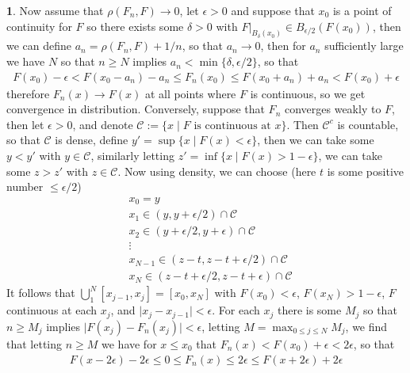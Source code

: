 \documentclass[10.5pt]{article}
\theoremstyle{definition}
\newtheorem{pb}{}
\newcommand{\set}[1]{\{#1\}}
\newcommand{\abs}[1]{\lvert#1\rvert}
\begin{document}
\begin{pb}
        Now assume that \(\rho(F_n,F) \to 0\), let \(\epsilon > 0\) and suppose that \(x_0\) is a point of continuity for \(F\) so there exists some \(\delta > 0\) with \(F\vert_{B_\delta(x_0)} \in B_{\epsilon/2}(F(x_0)) \), then we can define \(a_n = \rho(F_n,F) + 1/n\), so that \(a_n \to 0\), then for \(a_n\) sufficiently large we have \(N\) so that \(n \geq N\) implies \(a_n < \min\set{\delta,\epsilon/2}\), so that
        \begin{align*}
            F(x_0) - \epsilon < F(x_0 - a_n) - a_n \leq F_n(x_0) \leq F(x_0 + a_n) + a_n < F(x_0) + \epsilon
        \end{align*}
        therefore \(F_n(x) \to F(x)\) at all points where \(F\) is continuous, so we get convergence in distribution. Conversely, suppose that \(F_n\) converges weakly to \(F\), then let \(\epsilon > 0\), and denote \(\mathcal{C} := \set{x \mid F \text{ is continuous at }x}\). Then \(\mathcal{C}^c\) is countable, so that \(\mathcal{C}\) is dense, define \(y' = \sup\set{x \mid F(x) < \epsilon}\), then we can take some \(y < y'\) with \(y \in \mathcal{C}\), similarly letting \(z' = \inf\set{x \mid F(x) > 1 - \epsilon}\), we can take some \(z > z'\) with \(z \in \mathcal{C}\). Now using density, we can choose (here \(t\) is some positive number \(\leq \epsilon/2\))
        \begin{align*}
            &x_0 = y \\
            &x_1 \in (y,y+\epsilon/2) \cap \mathcal{C} \\
            &x_2 \in (y+\epsilon/2,y+\epsilon) \cap \mathcal{C} \\
            &\vdots \\
            &x_{N-1} \in (z - t, z - t + \epsilon/2) \cap \mathcal{C} \\
            &x_N \in (z - t + \epsilon/2, z - t + \epsilon) \cap \mathcal{C}
        \end{align*}
        It follows that \(\bigcup_1^N [x_{j-1},x_j] = [x_0,x_N]\) with \(F(x_0) < \epsilon\), \(F(x_N) > 1 - \epsilon\), \(F\) continuous at each \(x_j\), and \(\abs{x_j - x_{j-1}} < \epsilon\). For each \(x_j\) there is some \(M_j\) so that \(n \geq M_j\) implies \(\abs{F(x_j) - F_n(x_j)} < \epsilon\), letting \(M = \max_{0 \leq j \leq N}{M_j}\), we find that letting \(n \geq M\) we have for \(x \leq x_0\) that \(F_n(x) < F(x_0) + \epsilon < 2 \epsilon\), so that
        \begin{align*}
            F(x - 2 \epsilon) - 2 \epsilon \leq 0 \leq F_n(x) \leq 2 \epsilon \leq F(x + 2 \epsilon) + 2 \epsilon

\end{align*}
\end{pb}
\end{document}
